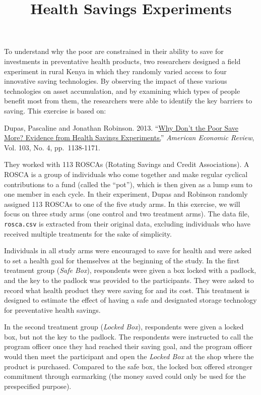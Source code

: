\documentclass[]{article}
\title{Health Savings Experiments}
\author{}
\date{}
\begin{document}
\maketitle


To understand why the poor are constrained in their ability to save for
investments in preventative health products, two researchers designed a
field experiment in rural Kenya in which they randomly varied access to
four innovative saving technologies. By observing the impact of these
various technologies on asset accumulation, and by examining which types
of people benefit most from them, the researchers were able to identify
the key barriers to saving. This exercise is based on:

Dupas, Pascaline and Jonathan Robinson. 2013.
``\href{http://dx.doi.org/10.1257/aer.103.4.1138}{Why Don't the Poor
Save More? Evidence from Health Savings Experiments.}'' \emph{American
Economic Review}, Vol. 103, No. 4, pp.~1138-1171.

They worked with 113 ROSCAs (Rotating Savings and Credit Associations).
A ROSCA is a group of individuals who come together and make regular
cyclical contributions to a fund (called the ``pot''), which is then
given as a lump sum to one member in each cycle. In their experiment,
Dupas and Robinson randomly assigned 113 ROSCAs to one of the five study
arms. In this exercise, we will focus on three study arms (one control
and two treatment arms). The data file, \texttt{rosca.csv} is extracted
from their original data, excluding individuals who have received
multiple treatments for the sake of simplicity.

Individuals in all study arms were encouraged to save for health and
were asked to set a health goal for themselves at the beginning of the
study. In the first treatment group (\emph{Safe Box}), respondents were
given a box locked with a padlock, and the key to the padlock was
provided to the participants. They were asked to record what health
product they were saving for and its cost. This treatment is designed to
estimate the effect of having a safe and designated storage technology
for preventative health savings.

In the second treatment group (\emph{Locked Box}), respondents were
given a locked box, but not the key to the padlock. The respondents were
instructed to call the program officer once they had reached their
saving goal, and the program officer would then meet the participant and
open the \emph{Locked Box} at the shop where the product is purchased.
Compared to the safe box, the locked box offered stronger commitment
through earmarking (the money saved could only be used for the
prespecified purpose).
\end{document}
